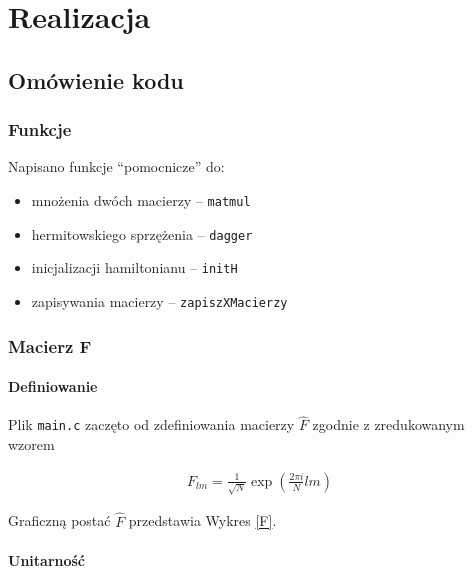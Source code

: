 \documentclass[final,a4paper,twocolumn,12pt]{article}
\title{\Huge{\textgoth{Sprawozdanie - Projekt 8}}}
\author{\Huge{\textfrak{Maciej Flaga}}}
\date{}
\begin{document}
\maketitle

\section{Realizacja}

\subsection{Omówienie kodu}

\subsubsection{Funkcje}

Napisano funkcje ``pomocnicze'' do:

\begin{itemize}
    \item mnożenia dwóch macierzy -- \texttt{matmul}
    \item hermitowskiego sprzężenia -- \texttt{dagger}
    \item inicjalizacji hamiltonianu -- \texttt{initH}
    \item zapisywania macierzy -- \texttt{zapiszXMacierzy}
\end{itemize}

\subsubsection{Macierz F}

\paragraph{Definiowanie}

Plik \texttt{main.c} zaczęto od zdefiniowania macierzy $\hat{F}$ zgodnie z zredukowanym wzorem

\begin{align*}
    F_{lm} = \frac{1}{\sqrt{N}}\exp{\left(\frac{2\pi i }{N}lm\right)}
\end{align*}

Graficzną postać $\hat{F}$ przedstawia Wykres \vref{F}.

\paragraph{Unitarność}
\end{document}
